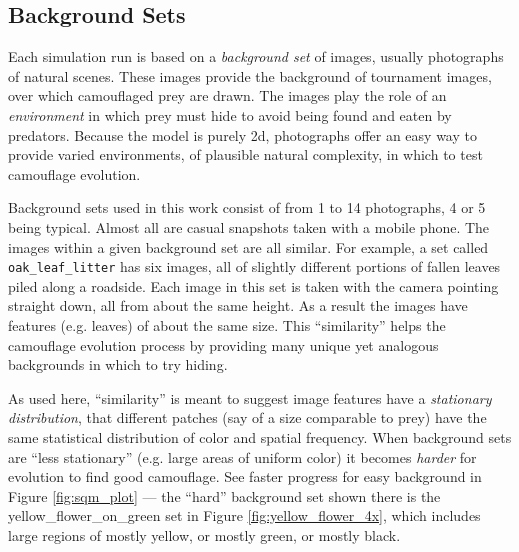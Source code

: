 \documentclass[letterpaper]{article}
\newcommand{\jargon}[1]{\textit{#1}}
\newcommand{\runID}{\footnotesize}
\newcommand{\igfour}[1]{\texttt{[image: \#1]}}
\newcommand{\stt}[1]{{\small \texttt{#1}}}
\begin{document}


\subsection{Background Sets}
\label{subsec:background_sets}
Each simulation run is based on a \jargon{background set} of images, usually photographs of natural scenes. These images provide the background of tournament images, over which camouflaged prey are drawn. The images play the role of an \jargon{environment} in which prey must hide to avoid being found and eaten by predators. Because the model is purely 2d, photographs offer an easy way to provide varied environments, of plausible natural complexity, in which to test camouflage evolution.
\par
Background sets used in this work consist of from 1 to 14 photographs, 4 or 5 being typical. Almost all are casual snapshots taken with a mobile phone. The images within a given background set are all similar. For example, a set called \stt{oak\_leaf\_litter} has six images, all of slightly different portions of fallen leaves piled along a roadside. Each image in this set is taken with the camera pointing straight down, all from about the same height. As a result the images have features (e.g. leaves) of about the same size. This ``similarity'' helps the camouflage evolution process by providing many unique yet analogous backgrounds in which to try hiding.
\par
As used here, ``similarity'' is meant to suggest image features have a \jargon{stationary distribution}, that different patches (say of a size comparable to prey) have the same statistical distribution of color and spatial frequency. When background sets are ``less stationary'' (e.g. large areas of uniform color) it becomes \jargon{harder} for evolution to find good camouflage. See faster progress for easy background in Figure \ref{fig:sqm_plot} — the ``hard'' background set shown there is the yellow\_flower\_on\_green set in Figure \ref{fig:yellow_flower_4x}, which includes large regions of mostly yellow, or mostly green, or mostly black.
\par
\end{document}

